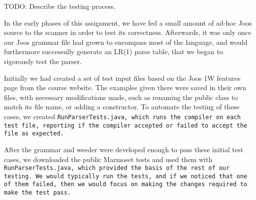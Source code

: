 \documentclass[12pt]{article}
\begin{document}
TODO: Describe the testing process.

In the early phases of this assignment, we have fed a small amount of ad-hoc Joos source to the scanner in order to test its correctness. Afterwards, it was only once our Joos grammar file had grown to encompass most of the language, and would furthermore successully generate an LR(1) parse table, that we began to rigorously test the parser.

Initially we had created a set of test input files based on the Joos 1W features page from the course website. The examples given there were saved in their own files, with necessary modifications made, such as renaming the public class to match its file name, or adding a constructor. To automate the testing of these cases, we created \tt{RunParserTests.java}, which runs the compiler on each test file, reporting if the compiler accepted or failed to accept the file as expected. 

After the grammar and weeder were developed enough to pass these initial test cases, we downloaded the public Marmoset tests and used them with \tt{RunParserTests.java}, which provided the basis of the rest of our testing. We would typically run the tests, and if we noticed that one of them failed, then we would focus on making the changes required to make the test pass.
\end{document}
